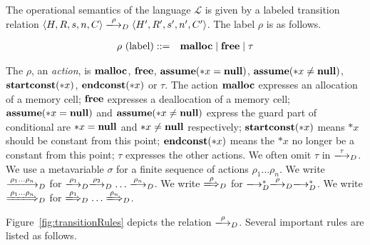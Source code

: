 The operational semantics of the language \(\mathcal{L}\) is given by
a labeled transition relation \(\langle H, R, s, n, C \rangle
\xlongrightarrow{\rho}_D \langle H', R', s', n', C' \rangle\). The label
\(\rho\) is as follows.

\begin{eqnarray*}
 \rho \mbox{ (label)} &::=& \Malloc \mid \Free \mid \tau %
\end{eqnarray*}

The \(\rho\), an \emph{action}, is \(\mathbf{malloc}\), \(\mathbf{free}\), \(\mathbf{assume}(*x = \mathbf{null})\),
\(\mathbf{assume}(*x \ne \mathbf{null})\), \(\mathbf{startconst}(*x)\), \(\mathbf{endconst}(*x) \) or \(\tau\).  The action
\(\mathbf{malloc}\) expresses an allocation of a memory cell; \(\mathbf{free}\)
expresses a deallocation of a memory cell; \(\mathbf{assume}(*x = \mathbf{null})\) and \(\mathbf{assume}(*x \ne \mathbf{null})\)
express the guard part of conditional are \( *x = \mathbf{null} \) and \(*x \ne \mathbf{null}\)
respectively; \(\mathbf{startconst}(*x)\) means \(*x\) should be constant from
this point; \(\mathbf{endconst}(*x)\) means the \(*x\) no longer be a constant
from this point; \(\tau\) expresses the other actions.  We often omit
\(\tau\) in \(\xlongrightarrow{\tau}_D\).  We use a metavariable
\(\sigma\) for a finite sequence of actions \(\rho_1\dots\rho_n\).  We
write \(\xlongrightarrow{\rho_1\dots\rho_n}_D\) for
\(\xlongrightarrow{\rho_1}_D\xlongrightarrow{\rho_2}_D\dots\xlongrightarrow{\rho_n}_D\).
We write \(\xLongrightarrow{\rho}_D\) for
\(\xlongrightarrow{}_D^*\xlongrightarrow{\rho}_D\xlongrightarrow{}_D^*\).
We write \(\xLongrightarrow{\rho_1\dots\rho_n}_D\) for
\(\xLongrightarrow{\rho_1}_D\dots\xLongrightarrow{\rho_n}_D\).

Figure~\ref{fig:transitionRules} depicts the relation
\(\xlongrightarrow{\rho}_D\). Several important rules are listed as
follows.

